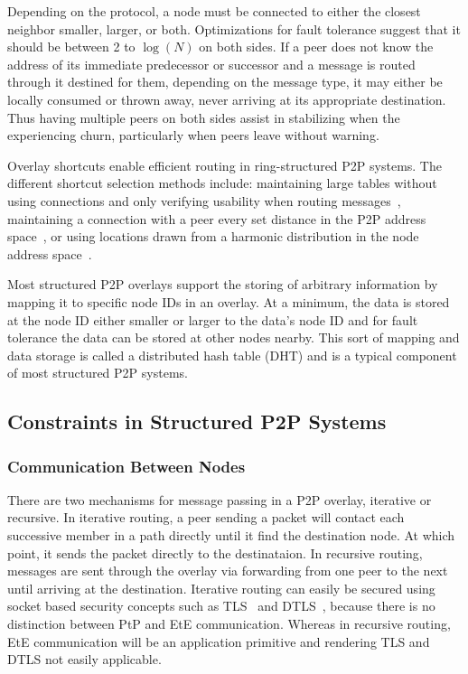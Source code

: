 \documentclass[conference]{IEEEtran}
\begin{document}
Depending on the protocol, a node must be connected to either the closest
neighbor smaller, larger, or both.  Optimizations for fault tolerance suggest
that it should be between 2 to $\log(N)$ on both sides.  If a peer does not
know the address of its immediate predecessor or successor and a message
is routed through it destined for them, depending on the message type, it may
either be locally consumed or thrown away, never arriving at its appropriate
destination.  Thus having multiple peers on both sides assist in stabilizing
when the experiencing churn, particularly when peers leave without warning.

Overlay shortcuts enable efficient routing in ring-structured P2P systems.  The
different shortcut selection methods include: maintaining large tables without
using connections and only verifying usability when routing
messages~\cite{pastry, kademlia}, maintaining a connection with a peer every
set distance in the P2P address space~\cite{chord}, or using locations drawn
from a harmonic distribution in the node address space~\cite{symphony}.

Most structured P2P overlays support the storing of arbitrary information by
mapping it to specific node IDs in an overlay.  At a minimum, the data is stored
at the node ID either smaller or larger to the data's node ID and for fault
tolerance the data can be stored at other nodes nearby.  This sort of mapping
and data storage is called a distributed hash table (DHT) and is a typical
component of most structured P2P systems.

\subsection{Constraints in Structured P2P Systems}
\subsubsection{Communication Between Nodes}
There are two mechanisms for message passing in a P2P overlay, iterative or
recursive.  In iterative routing, a peer sending a packet will contact each
successive member in a path directly until it find the destination node.  At
which point, it sends the packet directly to the destinataion.  In recursive
routing, messages are sent through the overlay via forwarding from one peer to
the next until arriving at the destination.  Iterative routing can easily be
secured using socket based security concepts such as TLS~\cite{tls} and
DTLS~\cite{dtls}, because there is no distinction between PtP
and EtE communication.  Whereas in recursive routing, EtE
communication will be an application primitive and rendering TLS and DTLS not
easily applicable.
\end{document}
